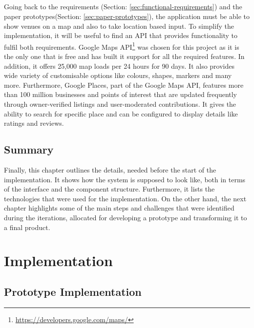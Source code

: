 \documentclass{l4proj}
\begin{document}
\paragraph{}
Going back to the requirements (Section: \ref{sec:functional-requirements}) and the paper prototypes(Section: \ref{sec:paper-prototypes}), the application must be able to show venues on a map and also to take location based input. To simplify the implementation, it will be useful to find an API that provides functionality to fulfil both requirements. Google Maps API\footnote{\url{https://developers.google.com/maps/}} was chosen for this project as it is the only one that is free and has built it support for all the required features. In addition, it offers 25,000 map loads per 24 hours for 90 days\cite{mapusage}. It also provides wide variety of customisable options like colours, shapes, markers and many more. Furthermore, Google Places\cite{mapplace}, part of the Google Maps API, features more than 100 million businesses and points of interest that are updated frequently through owner-verified listings and user-moderated contributions. It gives the ability to search for specific place and can be configured to display details like ratings and reviews.

\section{Summary}
Finally, this chapter outlines the details, needed before the start of the implementation. It shows how the system is supposed to look like, both in terms of the interface and the component structure. Furthermore, it lists the technologies that were used for the implementation. On the other hand, the next chapter highlights some of the main steps and challenges that were identified during the iterations, allocated for developing a prototype and transforming it to a final product.    

\chapter{Implementation}
\section{Prototype Implementation}
\end{document}
